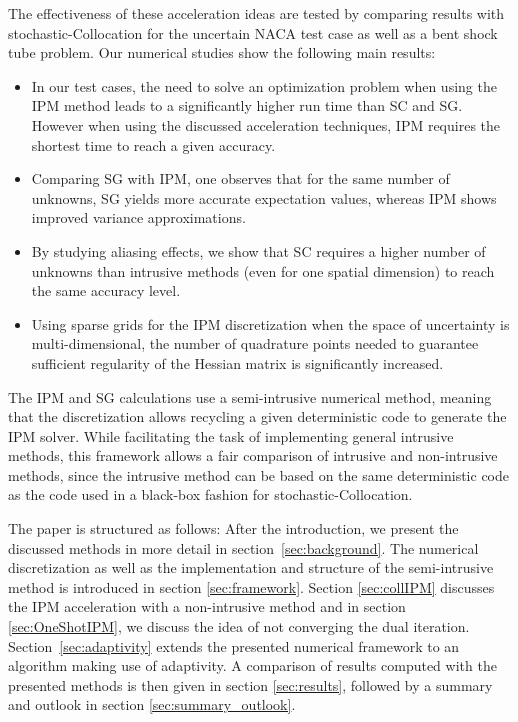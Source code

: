 The effectiveness of these acceleration ideas are tested by comparing results with stochastic-Collocation for the uncertain NACA test case as well as a bent shock tube problem. Our numerical studies show the following main results:
\begin{itemize}
\item In our test cases, the need to solve an optimization problem when using the IPM method leads to a significantly higher run time than SC and SG. However when using the discussed acceleration techniques, IPM requires the shortest time to reach a given accuracy.
\item Comparing SG with IPM, one observes that for the same number of unknowns, SG yields more accurate expectation values, whereas IPM shows improved variance approximations.
\item By studying aliasing effects, we show that SC requires a higher number of unknowns than intrusive methods (even for one spatial dimension) to reach the same accuracy level.
\item Using sparse grids for the IPM discretization when the space of uncertainty is multi-dimensional, the number of quadrature points needed to guarantee sufficient regularity of the Hessian matrix is significantly increased.
\end{itemize}
The IPM and SG calculations use a semi-intrusive numerical method, meaning that the discretization allows recycling a given deterministic code to generate the IPM solver. While facilitating the task of implementing general intrusive methods, this framework allows a fair comparison of intrusive and non-intrusive methods, since the intrusive method can be based on the same deterministic code as the code used in a black-box fashion for stochastic-Collocation.

The paper is structured as follows: After the introduction, we present the discussed methods in more detail in section~\ref{sec:background}. The numerical discretization as well as the implementation and structure of the semi-intrusive method is introduced in section \ref{sec:framework}. Section \ref{sec:collIPM} discusses the IPM acceleration with a non-intrusive method and in section \ref{sec:OneShotIPM}, we discuss the idea of not converging the dual iteration. Section~\ref{sec:adaptivity} extends the presented numerical framework to an algorithm making use of adaptivity. A comparison of results computed with the presented methods is then given in section \ref{sec:results}, followed by a summary and outlook in section \ref{sec:summary_outlook}.

